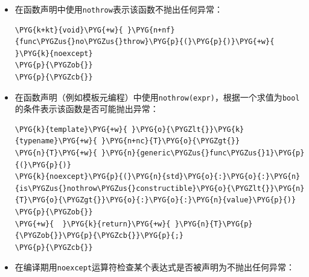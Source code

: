 \begin{itemize}
\item 在函数声明中使用\texttt{nothrow}表示该函数不抛出任何异常：



\begin{codeblockbg}
\begin{Verbatim}[commandchars=\\\{\},breaklines=true,breakanywhere=true,fontsize=\codefont,xleftmargin=17bp]
\PYG{k+kt}{void}\PYG{+w}{ }\PYG{n+nf}{func\PYGZus{}no\PYGZus{}throw}\PYG{p}{(}\PYG{p}{)}\PYG{+w}{ }\PYG{k}{noexcept}
\PYG{p}{\PYGZob{}}
\PYG{p}{\PYGZcb{}}
\end{Verbatim}
\end{codeblockbg}



\item 在函数声明（例如模板元编程）中使用\texttt{nothrow(\allowbreak{}expr)}，根据一个求值为\texttt{bool}的条件表示该函数是否可能抛出异常：



\begin{codeblockbg}
\begin{Verbatim}[commandchars=\\\{\},breaklines=true,breakanywhere=true,fontsize=\codefont,xleftmargin=17bp]
\PYG{k}{template}\PYG{+w}{ }\PYG{o}{\PYGZlt{}}\PYG{k}{typename}\PYG{+w}{ }\PYG{n+nc}{T}\PYG{o}{\PYGZgt{}}
\PYG{n}{T}\PYG{+w}{ }\PYG{n}{generic\PYGZus{}func\PYGZus{}1}\PYG{p}{(}\PYG{p}{)}
\PYG{k}{noexcept}\PYG{p}{(}\PYG{n}{std}\PYG{o}{:}\PYG{o}{:}\PYG{n}{is\PYGZus{}nothrow\PYGZus{}constructible}\PYG{o}{\PYGZlt{}}\PYG{n}{T}\PYG{o}{\PYGZgt{}}\PYG{o}{:}\PYG{o}{:}\PYG{n}{value}\PYG{p}{)}
\PYG{p}{\PYGZob{}}
\PYG{+w}{  }\PYG{k}{return}\PYG{+w}{ }\PYG{n}{T}\PYG{p}{\PYGZob{}}\PYG{p}{\PYGZcb{}}\PYG{p}{;}
\PYG{p}{\PYGZcb{}}
\end{Verbatim}
\end{codeblockbg}



\item 在编译期用\texttt{noexcept}运算符检查某个表达式是否被声明为不抛出任何异常：




\end{itemize}
